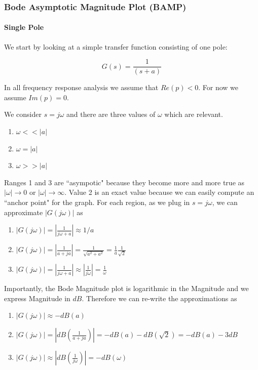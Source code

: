 \subsubsection{Bode Asymptotic Magnitude Plot (BAMP)}


\paragraph{Single Pole}

We start by looking at a simple transfer function consisting of one pole:

\[
G(s) = \frac{1}{(s+a)}
\]

In all frequency response analysis we assume that $Re(p) < 0$.  For now we assume $Im(p) = 0$.

We consider $s=j\omega$ and there are three values of $\omega$ which are relevant.

\begin{enumerate}
  \item  $\omega << |a|$
  \item  $\omega = |a|$
  \item  $\omega >> |a|$
\end{enumerate}

Ranges 1 and 3 are ``asympotic" because they become more and more true as $|\omega| \to 0$ or $|\omega| \to \infty$. Value 2 is an exact value  because we can easily compute an ``anchor point" for the graph.
For each region, as we plug in $s=j\omega$, we can approximate $|G(j\omega)|$ as

\begin{enumerate}
  \item  $|G(j\omega)| = \left | \frac{1}{j\omega+a} \right |  \approx 1/a$
  \item  $|G(j\omega)| = \left | \frac{1}{a+ja}    \right |       =    \frac {1} {\sqrt{a^2+a^2}} = \frac{1}{a}\frac{1}{\sqrt{2}}$
  \item  $|G(j\omega)| = \left | \frac{1}{j\omega+a} \right |  \approx \left | \frac{1}{j\omega} \right | = \frac{1}{\omega}$
\end{enumerate}

Importantly, the Bode Magnitude plot is logarithmic in the Magnitude and we express Magnitude in $dB$.
Therefore we can re-write the  approximations  as

\begin{enumerate}
  \item  $|G(j\omega)| \approx -dB(a)$
  \item  $|G(j\omega)| = \left | dB(\frac{1}{a+ja})    \right | = -dB(a) - dB(\sqrt{2}) = -dB(a) -3dB$
  \item  $|G(j\omega)| \approx \left | dB(\frac{1}{j\omega}) \right | = -dB(\omega)$
\end{enumerate}

